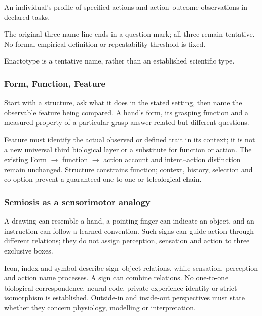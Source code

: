 \noindent An individual’s profile of specified actions and action–outcome observations in declared tasks.\par

\noindent The original three-name line ends in a question mark; all three remain tentative. No formal empirical definition or repeatability threshold is fixed.\par

\noindent Enactotype is a tentative name, rather than an established scientific type.\par


\subsubsection*{Form, Function, Feature}

\noindent Start with a structure, ask what it does in the stated setting, then name the observable feature being compared. A hand’s form, its grasping function and a measured property of a particular grasp answer related but different questions.\par

\noindent Feature must identify the actual observed or defined trait in its context; it is not a new universal third biological layer or a substitute for function or action. The existing Form \(\rightarrow\) function \(\rightarrow\) action account and intent–action distinction remain unchanged. Structure constrains function; context, history, selection and co-option prevent a guaranteed one-to-one or teleological chain.\par


\subsubsection*{Semiosis as a sensorimotor analogy}

\noindent A drawing can resemble a hand, a pointing finger can indicate an object, and an instruction can follow a learned convention. Such signs can guide action through different relations; they do not assign perception, sensation and action to three exclusive boxes.\par

\noindent Icon, index and symbol describe sign–object relations, while sensation, perception and action name processes. A sign can combine relations. No one-to-one biological correspondence, neural code, private-experience identity or strict isomorphism is established. Outside-in and inside-out perspectives must state whether they concern physiology, modelling or interpretation.\par

